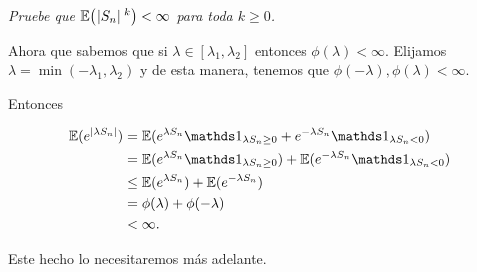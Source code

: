\emph{
	Pruebe que $\mathbb{E}\! \left( \hspace{.25mm}\left|S_n\right|\hspace{.25mm}^k \right)<\infty$ para toda $k\geq 0$.
}

\afterstatement\par\null

Ahora que sabemos que si $\lambda \in [\lambda_1, \lambda_2]$ entonces $\phi(\lambda) < \infty$. Elijamos 
$\lambda = \min(-\lambda_1, \lambda_2)$ y de esta manera, tenemos que $\phi(-\lambda), \phi(\lambda) < \infty$.\par\null

Entonces

\begin{align}
    \E(e^{|\lambda S_n|})   &=      \E(e^{\lambda S_n} \indic_{\lambda S_n \geq 0} + e^{-\lambda S_n} \indic_{\lambda S_n < 0} )        \\ 
                            &=      \E(e^{\lambda S_n} \indic_{\lambda S_n \geq 0}) + \E(e^{-\lambda S_n} \indic_{\lambda S_n < 0})     \\
                            &\leq   \E(e^{\lambda S_n} ) + \E(e^{-\lambda S_n})                                                         \\
                            &=      \phi(\lambda) + \phi(-\lambda)                                                                      \\
                            &<      \infty.                                                  
\end{align}\par\null

Este hecho lo necesitaremos más adelante.\par\null